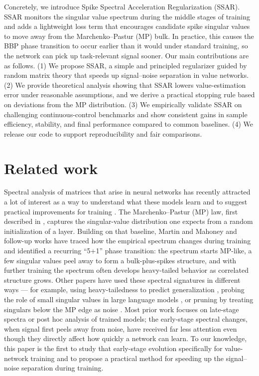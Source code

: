 Concretely, we introduce Spike Spectral Acceleration Regularization (SSAR). SSAR monitors the singular value spectrum during the middle stages of training and adds a lightweight loss term that encourages candidate spike singular values to move away from the Marchenko–Pastur (MP) bulk. In practice, this causes the BBP phase transition to occur earlier than it would under standard training, so the network can pick up task-relevant signal sooner. Our main contributions are as follows. (1) We propose SSAR, a simple and principled regularizer guided by random matrix theory that speeds up signal–noise separation in value networks. (2) We provide theoretical analysis showing that SSAR lowers value-estimation error under reasonable assumptions, and we derive a practical stopping rule based on deviations from the MP distribution. (3) We empirically validate SSAR on challenging continuous-control benchmarks and show consistent gains in sample efficiency, stability, and final performance compared to common baselines. (4) We release our code to support reproducibility and fair comparisons.

\section{Related work}
\label{sec:related}
Spectral analysis of matrices that arise in neural networks has recently attracted a lot of interest as a way to understand what these models learn and to suggest practical improvements for training \cite{papyan2018full,sagun2016eigenvalues,ge2021large,pennington2017nonlinear}. The Marchenko–Pastur (MP) law, first described in \cite{marvcenko1967distribution}, captures the singular-value distribution one expects from a random initialization of a layer. Building on that baseline, Martin and Mahoney \cite{martin2021implicit} and follow-up works have traced how the empirical spectrum changes during training and identified a recurring “5+1” phase transition: the spectrum starts MP-like, a few singular values peel away to form a bulk-plus-spikes structure, and with further training the spectrum often develops heavy-tailed behavior as correlated structure grows. Other papers have used these spectral signatures in different ways — for example, using heavy-tailedness to predict generalization  \cite{martin2021predicting}, probing the role of small singular values in large language models \cite{staats2024small}, or pruning by treating singulars below the MP edge as noise \cite{berlyand2023enhancing,berlyand2025pruning}. Most prior work focuses on late-stage spectra or post hoc analysis of trained models; the early-stage spectral changes, when signal first peels away from noise, have received far less attention even though they directly affect how quickly a network can learn. To our knowledge, this paper is the first to study that early-stage evolution specifically for value-network training and to propose a practical method for speeding up the signal–noise separation during training.
